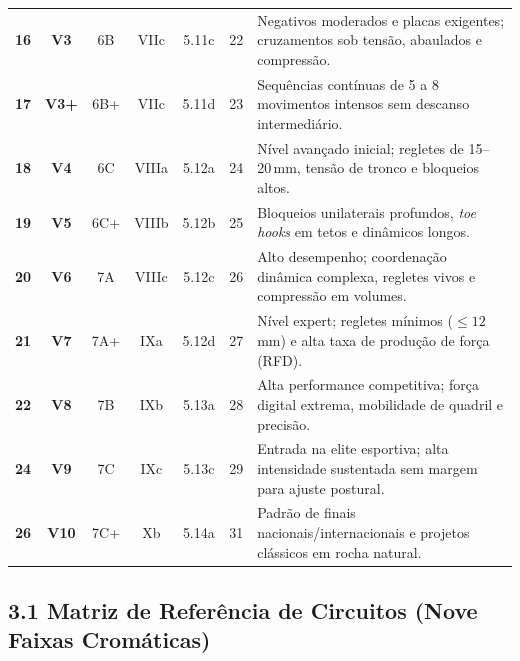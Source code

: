 \begin{table}[!htbp]
\begin{tabularx}{\linewidth}{ccccccX}
\rowcolor{rowgray}
\textbf{16} & \textbf{V3}  & 6B  & VIIc  & 5.11c & 22 & Negativos moderados e placas exigentes; cruzamentos sob tensão, abaulados e compressão. \\
\rowcolor{rowgray}
\textbf{17} & \textbf{V3+} & 6B+ & VIIc  & 5.11d & 23 & Sequências contínuas de 5 a 8 movimentos intensos sem descanso intermediário. \\
\rowcolor{rowgray}
\textbf{18} & \textbf{V4}  & 6C  & VIIIa & 5.12a & 24 & Nível avançado inicial; regletes de 15--20\,mm, tensão de tronco e bloqueios altos. \\
\textbf{19} & \textbf{V5}  & 6C+ & VIIIb & 5.12b & 25 & Bloqueios unilaterais profundos, \textit{toe hooks} em tetos e dinâmicos longos. \\
\rowcolor{rowgray}
\textbf{20} & \textbf{V6}  & 7A  & VIIIc & 5.12c & 26 & Alto desempenho; coordenação dinâmica complexa, regletes vivos e compressão em volumes. \\
\textbf{21} & \textbf{V7}  & 7A+ & IXa   & 5.12d & 27 & Nível expert; regletes mínimos ($\le 12$\,mm) e alta taxa de produção de força (RFD). \\
\rowcolor{rowgray}
\textbf{22} & \textbf{V8}  & 7B  & IXb   & 5.13a & 28 & Alta performance competitiva; força digital extrema, mobilidade de quadril e precisão. \\
\rowcolor{rowgray}
\textbf{24} & \textbf{V9}  & 7C  & IXc   & 5.13c & 29 & Entrada na elite esportiva; alta intensidade sustentada sem margem para ajuste postural. \\
\rowcolor{rowgray}
\textbf{26} & \textbf{V10} & 7C+ & Xb    & 5.14a & 31 & Padrão de finais nacionais/internacionais e projetos clássicos em rocha natural. \\
\bottomrule
\end{tabularx}
\end{table}

\clearpage
\subsection*{3.1 Matriz de Referência de Circuitos (Nove Faixas Cromáticas)}

